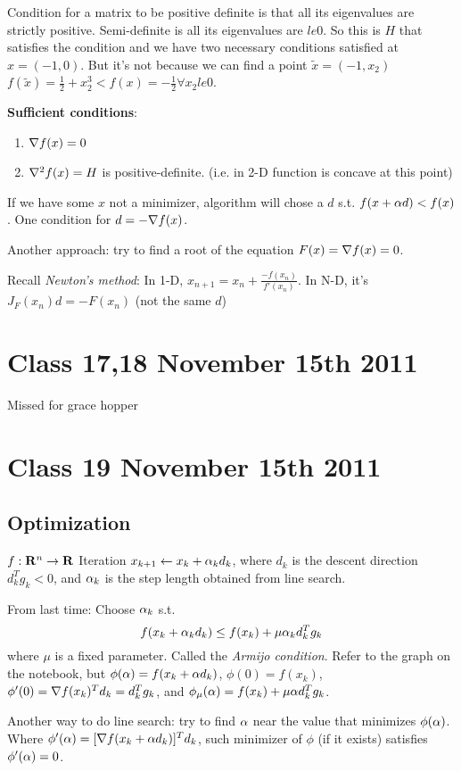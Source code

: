 Condition for a matrix to be positive definite is that all its
eigenvalues are strictly positive. Semi-definite is all its
eigenvalues are $le 0$. So this is $H$ that satisfies the condition
and we have two necessary conditions satisfied at $x=(-1, 0)$.
But it's not because we can find a point $\tilde x=(-1, x_2)$
$f(\tilde x) = \frac{1}{2} + x_2^3 < f(x) = -\frac{1}{2} \forall x_2
le 0$.

\textbf{Sufficient conditions}:
\begin{enumerate}
\item $\nabla f(x) = 0$
\item $\nabla^2 f(x) = H$ is positive-definite. (i.e. in 2-D function
  is concave at this point)
\end{enumerate}

If we have some $x$ not a minimizer, algorithm will chose a $d$
s.t. $f(x+\alpha d) < f(x)$. One condition for $d = -\nabla f(x)$.

Another approach: try to find a root of the equation $F(x) = \nabla
f(x) = 0$.

Recall \emph{Newton's method}: In 1-D, $x_{n+1} = x_{n} +
\frac{-f(x_n)}{f'(x_n)}$.
In N-D, it's $J_F(x_n)d = -F(x_n)$ (not the same $d$)

\pagebreak
\section{Class 17,18 November 15th 2011} Missed for grace hopper 
\section{Class 19 November 15th 2011}
\label{sec:class19}

\subsection{Optimization}
$f:\mathbf{R}^n \rightarrow \mathbf{R}$ Iteration $x_{k+1} \leftarrow x_k +\alpha_k
d_k$, where $d_k$ is the descent direction $d_k^Tg_k < 0$, and $\alpha_k$
is the step length obtained from line search.

From last time: Choose $\alpha_k$ s.t. $$f(x_k+\alpha_kd_k) \le f(x_k) + \mu
\alpha_kd_k^Tg_k$$ where $\mu$ is a fixed parameter. Called the \emph{Armijo condition}.
Refer to the graph on the notebook, but $\phi(\alpha) = f(x_k+\alpha d_k)$,
$\phi(0) = f(x_k)$, $\phi'(0) = \nabla f (x_k)^Td_k = d_k^Tg_k$, and
$\phi_\mu(\alpha) = f(x_k) + \mu\alpha d_k^Tg_k$.

Another way to do line search: try to find $\alpha$ near the value that
minimizes $\phi(\alpha)$.
Where $\phi'(\alpha) = [\nabla f (x_k+\alpha d_k)]^Td_k$, such minimizer of $\phi$ (if it
exists) satisfies $\phi'(\alpha) = 0$.

